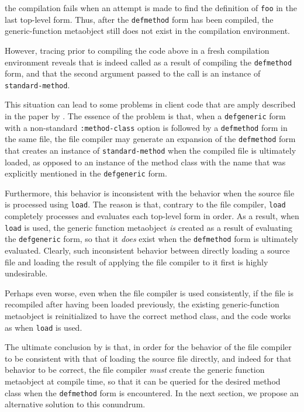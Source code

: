 \noindent
the compilation fails when an attempt is made to find the definition
of \texttt{foo} in the last top-level form.  Thus, after the
\texttt{defmethod} form has been compiled, the generic-function
metaobject still does not exist in the compilation environment.

However, tracing \mml{} prior to compiling the code above in a fresh
compilation environment reveals that \mml{} is indeed called as a
result of compiling the \texttt{defmethod} form, and that the second
argument passed to the call is an instance of
\texttt{standard-method}.

This situation can lead to some problems in client code that are amply
described in the paper by \cnh{}.  The essence of the
problem is that, when a \texttt{defgeneric} form with a
non-standard \texttt{:method-class} option is followed by a
\texttt{defmethod} form in the same file, the file compiler may
generate an expansion of the \texttt{defmethod} form that creates an
instance of \texttt{standard-method} when the compiled file is
ultimately loaded, as opposed to an instance of the method class with
the name that was explicitly mentioned in the \texttt{defgeneric}
form.

Furthermore, this behavior is inconsistent with the behavior when the
source file is processed using \texttt{load}.  The reason is that,
contrary to the file compiler, \texttt{load} completely processes and
evaluates each top-level form in order.  As a result, when
\texttt{load} is used, the generic function metaobject \emph{is}
created as a result of evaluating the \texttt{defgeneric} form, so
that it \emph{does} exist when the \texttt{defmethod} form is
ultimately evaluated.  Clearly, such inconsistent behavior between
directly loading a source file and loading the result of applying the
file compiler to it first is highly undesirable.

Perhaps even worse, even when the file compiler is used consistently,
if the file is recompiled after having been loaded previously, the
existing generic-function metaobject is reinitialized to have the
correct method class, and the code works as when \texttt{load} is
used.

The ultimate conclusion by \cnh{} is that, in order for
the behavior of the file compiler to be consistent with that of
loading the source file directly, and indeed for that behavior to be
correct, the file compiler \emph{must} create the generic function
metaobject at compile time, so that it can be queried for the desired
method class when the \texttt{defmethod} form is encountered.  In the
next section, we propose an alternative solution to this conundrum.

